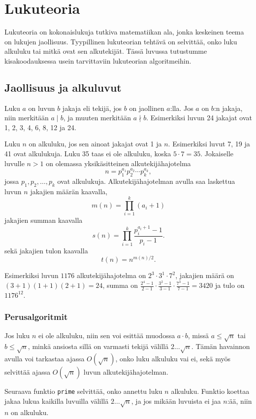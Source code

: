 \chapter{Lukuteoria}

Lukuteoria on kokonaislukuja tutkiva matematiikan ala,
jonka keskeinen teema on lukujen jaollisuus.
Tyypillinen lukuteorian tehtävä on selvittää,
onko luku alkuluku tai mitkä ovat sen alkutekijät.
Tässä luvussa tutustumme kisakoodauksessa usein
tarvittaviin lukuteorian algoritmeihin.

\section{Jaollisuus ja alkuluvut}

Luku $a$ on luvun $b$ jakaja eli tekijä,
jos $b$ on jaollinen $a$:lla.
Jos $a$ on $b$:n jakaja,
niin merkitään $a \mid b$,
ja muuten merkitään $a \nmid b$.
Esimerkiksi luvun 24 jakajat ovat 1, 2, 3, 4, 6, 8, 12 ja 24.

Luku $n$ on alkuluku, jos sen ainoat jakajat ovat 1 ja $n$.
Esimerkiksi luvut 7, 19 ja 41 ovat alkulukuja.
Luku 35 taas ei ole alkuluku, koska $5 \cdot 7 = 35$.
Jokaiselle luvulle $n>1$ on olemassa yksikäsitteinen
alkutekijähajotelma
\[ n = p_1^{a_1} p_2^{a_2} \cdots p_k^{a_k},\]
jossa $p_1,p_2,\ldots,p_k$ ovat alkulukuja.
Alkutekijähajotelman avulla saa laskettua
luvun $n$ jakajien määrän kaavalla,
\[m(n)=\prod_{i=1}^k (a_i+1)\]
jakajien summan kaavalla
\[s(n)=\prod_{i=1}^k \frac{p_i^{a_i+1}-1}{p_i-1}.\]
sekä jakajien tulon kaavalla
\[t(n)=n^{m(n)/2}.\]

Esimerkiksi luvun $1176$ alkutekijähajotelma on
$2^3 \cdot 3^1 \cdot 7^2$,
jakajien määrä on $(3+1)(1+1)(2+1)=24$,
summa on $\frac{2^4-1}{2-1} \cdot \frac{3^2-1}{3-1} \cdot \frac{7^3-1}{7-1} = 3420$
ja tulo on $1176^{12}$.

\subsection{Perusalgoritmit}

Jos luku $n$ ei ole alkuluku,
niin sen voi esittää muodossa $a \cdot b$,
missä $a \le \sqrt n$ tai $b \le \sqrt n$,
minkä ansiosta sillä on varmasti
tekijä välillä $2 \ldots \sqrt n$.
Tämän havainnon avulla voi tarkastaa ajassa $O(\sqrt n)$,
onko luku alkuluku vai ei,
sekä myös selvittää ajassa $O(\sqrt n)$
luvun alkutekijähajotelman.

Seuraava funktio \texttt{prime} selvittää,
onko annettu luku $n$ alkuluku.
Funktio koettaa jakaa lukua kaikilla luvuilla
välillä $2 \ldots \sqrt n$, ja jos mikään
luvuista ei jaa $n$:ää, niin $n$ on alkuluku.

